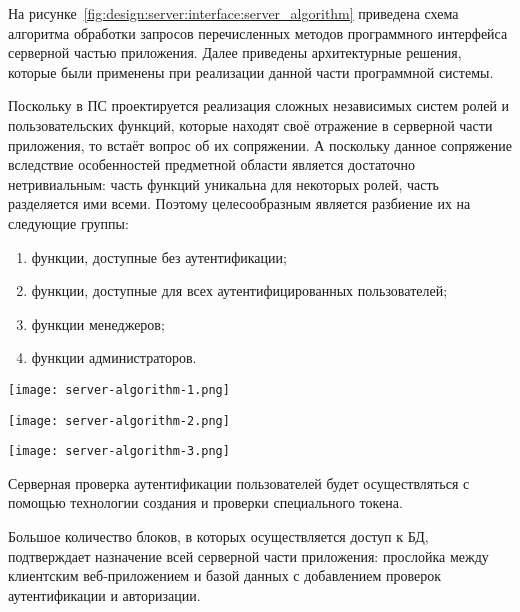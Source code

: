 На рисунке~\ref{fig:design:server:interface:server_algorithm} приведена схема алгоритма обработки запросов
перечисленных методов программного интерфейса серверной частью приложения. Далее приведены архитектурные решения,
которые были применены при реализации данной части программной системы. 

Поскольку в ПС проектируется реализация сложных независимых систем ролей и пользовательских функций, которые находят
своё отражение в серверной части приложения, то встаёт вопрос об их сопряжении. А поскольку данное сопряжение
вследствие особенностей предметной области является достаточно нетривиальным: часть функций уникальна для некоторых
ролей, часть разделяется ими всеми. Поэтому целесообразным является разбиение их на следующие группы:

\begin{enumerate}
	\item функции, доступные без аутентификации;
	\item функции, доступные для всех аутентифицированных пользователей;
	\item функции менеджеров;
	\item функции администраторов.
\end{enumerate}

\begin{sidewaysfigure}
  \centering
    \texttt{[image: server-algorithm-1.png]}
    \caption{Схема программы серверной части программного средства}
    \label{fig:design:server:interface:server_algorithm}
\end{sidewaysfigure}

\begin{sidewaysfigure}
  \ContinuedFloat
  \centering
    \texttt{[image: server-algorithm-2.png]}
    \caption{Схема программы серверной части программного средства (продолжение)}
\end{sidewaysfigure}
  
\begin{sidewaysfigure}
  \ContinuedFloat
  \centering
    \texttt{[image: server-algorithm-3.png]}
    \caption{Схема программы серверной части программного средства (окончание)}
\end{sidewaysfigure}

Серверная проверка аутентификации пользователей будет осуществляться с помощью технологии создания и проверки
специального токена.

Большое количество блоков, в которых осуществляется доступ к БД, подтверждает назначение всей серверной части
приложения: прослойка между клиентским веб-приложением и базой данных с добавлением проверок аутентификации и авторизации.

